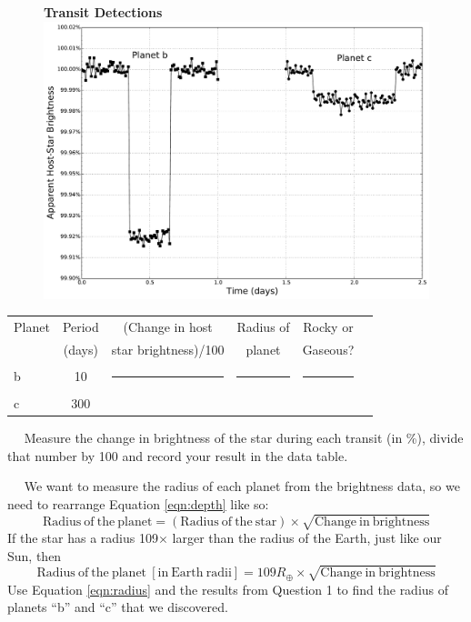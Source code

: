 \documentclass[12pt]{article}
\newcommand{\question}[1]{\vspace{10mm} \noindent {\bf #1)}~~}
\begin{document}
\begin{figure}[h!]
\centering
{\bf Transit Detections} \\
\includegraphics[scale=0.5]{plots/faketransit.pdf}
\end{figure}


\begin{table}[h!]
\centering
\begin{tabular}{|l |c |c| c| c| c|}
\hline
Planet & Period & (Change in host & Radius of & Rocky or  \\
 & (days) & star brightness)/100  &  planet  &  Gaseous? \\ \hline
b & 10 & \rule{0pt}{1.5cm} \rule{4cm}{0pt} & \rule{4cm}{0pt} & \rule{4cm}{0pt}\\ \hline
c & 300 & \rule{0pt}{1.5cm} & &\\ \hline
\end{tabular}
\end{table}

\pagebreak

\question{1} Measure the change in brightness of the star during each transit (in \%), divide that  number by 100 and record your result in the data table. 

\question{2} We want to measure the radius of each planet from the brightness data, so we need to rearrange Equation \ref{eqn:depth} like so:
\begin{equation}
\mathrm{Radius~of~the~planet} = \left( \mathrm{Radius~of~the~star} \right) \times \sqrt{\mathrm{Change~in~brightness}}
\end{equation}
If the star has a radius 109$\times$ larger than the radius of the Earth, just like our Sun, then 
\begin{equation}
\mathrm{Radius~of~the~planet~[in~Earth~radii]} = 109R_\oplus  \times \sqrt{\mathrm{Change~in~brightness}} \label{eqn:radius}
\end{equation}
Use Equation \ref{eqn:radius} and the results from Question 1 to find the radius of planets ``b'' and ``c'' that we discovered. 
\end{document}
